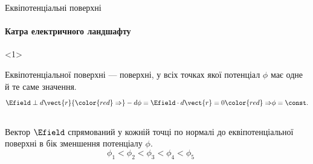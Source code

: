 \documentclass{beamer}
\begin{document}
\begin{frame}{Еквіпотенціальні поверхні}
	\framesubtitle<2-3>{Катра електричного ландшафту}
	\begin{onlyenv}
		\begin{block}{}\justifying
			\alert{Еквіпотенціальної поверхні} --- поверхні, у всіх точках якої потенціал
			$\phi$ має одне й те саме значення.
			\begin{equation*}
				\Efield \perp d\vect{r} {\color{red}\Rightarrow} -d\phi = \Efield\cdot d\vect{r} =
				0 {\color{red}\Rightarrow} \phi = \const.
			\end{equation*}
		\end{block}
		\begin{columns}
			\begin{column}{0.5\linewidth}
				\begin{block}{}\justifying
					Вектор $\Efield$ спрямований у кожній точці по нормалі до
					еквіпотенціальної поверхні в бік зменшення потенціалу $\phi$.
					\begin{equation*}
						\phi_1 < \phi_2 < \phi_3 < \phi_4 < \phi_5
					\end{equation*}
				\end{block}
			\end{column}
			\begin{column}{0.5\linewidth}\centering
				
			\end{column}
		\end{columns}




\end{onlyenv}
\end{frame}
\end{document}

